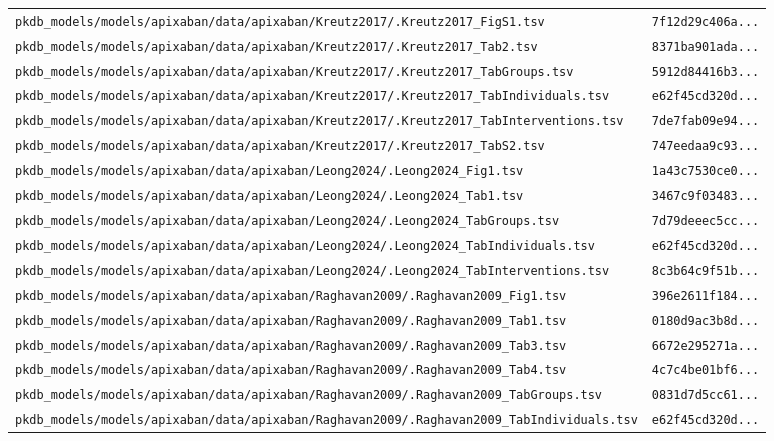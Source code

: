 \begin{longtable}{ll}
\texttt{pkdb\_models/models/apixaban/data/apixaban/Kreutz2017/.Kreutz2017\_FigS1.tsv} & \texttt{7f12d29c406a...} \\
\texttt{pkdb\_models/models/apixaban/data/apixaban/Kreutz2017/.Kreutz2017\_Tab2.tsv} & \texttt{8371ba901ada...} \\
\texttt{pkdb\_models/models/apixaban/data/apixaban/Kreutz2017/.Kreutz2017\_TabGroups.tsv} & \texttt{5912d84416b3...} \\
\texttt{pkdb\_models/models/apixaban/data/apixaban/Kreutz2017/.Kreutz2017\_TabIndividuals.tsv} & \texttt{e62f45cd320d...} \\
\texttt{pkdb\_models/models/apixaban/data/apixaban/Kreutz2017/.Kreutz2017\_TabInterventions.tsv} & \texttt{7de7fab09e94...} \\
\texttt{pkdb\_models/models/apixaban/data/apixaban/Kreutz2017/.Kreutz2017\_TabS2.tsv} & \texttt{747eedaa9c93...} \\
\texttt{pkdb\_models/models/apixaban/data/apixaban/Leong2024/.Leong2024\_Fig1.tsv} & \texttt{1a43c7530ce0...} \\
\texttt{pkdb\_models/models/apixaban/data/apixaban/Leong2024/.Leong2024\_Tab1.tsv} & \texttt{3467c9f03483...} \\
\texttt{pkdb\_models/models/apixaban/data/apixaban/Leong2024/.Leong2024\_TabGroups.tsv} & \texttt{7d79deeec5cc...} \\
\texttt{pkdb\_models/models/apixaban/data/apixaban/Leong2024/.Leong2024\_TabIndividuals.tsv} & \texttt{e62f45cd320d...} \\
\texttt{pkdb\_models/models/apixaban/data/apixaban/Leong2024/.Leong2024\_TabInterventions.tsv} & \texttt{8c3b64c9f51b...} \\
\texttt{pkdb\_models/models/apixaban/data/apixaban/Raghavan2009/.Raghavan2009\_Fig1.tsv} & \texttt{396e2611f184...} \\
\texttt{pkdb\_models/models/apixaban/data/apixaban/Raghavan2009/.Raghavan2009\_Tab1.tsv} & \texttt{0180d9ac3b8d...} \\
\texttt{pkdb\_models/models/apixaban/data/apixaban/Raghavan2009/.Raghavan2009\_Tab3.tsv} & \texttt{6672e295271a...} \\
\texttt{pkdb\_models/models/apixaban/data/apixaban/Raghavan2009/.Raghavan2009\_Tab4.tsv} & \texttt{4c7c4be01bf6...} \\
\texttt{pkdb\_models/models/apixaban/data/apixaban/Raghavan2009/.Raghavan2009\_TabGroups.tsv} & \texttt{0831d7d5cc61...} \\
\texttt{pkdb\_models/models/apixaban/data/apixaban/Raghavan2009/.Raghavan2009\_TabIndividuals.tsv} & \texttt{e62f45cd320d...} \\

\end{longtable}
